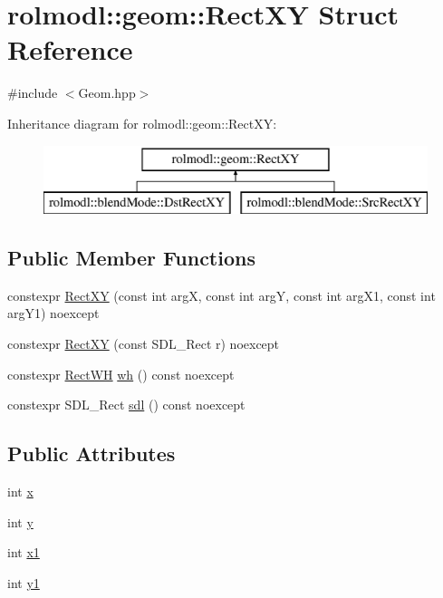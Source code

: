 \hypertarget{structrolmodl_1_1geom_1_1_rect_x_y}{}\section{rolmodl\+::geom\+::Rect\+XY Struct Reference}
\label{structrolmodl_1_1geom_1_1_rect_x_y}


{\ttfamily \#include $<$Geom.\+hpp$>$}

Inheritance diagram for rolmodl\+::geom\+::Rect\+XY\+:\begin{figure}[H]
\begin{center}
\leavevmode
\includegraphics[height=2.000000cm]{structrolmodl_1_1geom_1_1_rect_x_y}
\end{center}
\end{figure}
\subsection*{Public Member Functions}
\begin{DoxyCompactItemize}
\item 
constexpr \mbox{\hyperlink{structrolmodl_1_1geom_1_1_rect_x_y_a9ff683b479b94f3636c5b806db04295f}{Rect\+XY}} (const int argX, const int argY, const int arg\+X1, const int arg\+Y1) noexcept
\item 
constexpr \mbox{\hyperlink{structrolmodl_1_1geom_1_1_rect_x_y_aec79d83eaccbb02806a65cc811f0a05f}{Rect\+XY}} (const S\+D\+L\+\_\+\+Rect r) noexcept
\item 
constexpr \mbox{\hyperlink{structrolmodl_1_1geom_1_1_rect_w_h}{Rect\+WH}} \mbox{\hyperlink{structrolmodl_1_1geom_1_1_rect_x_y_ad47180f559f3389a30cda5a05bf686b2}{wh}} () const noexcept
\item 
constexpr S\+D\+L\+\_\+\+Rect \mbox{\hyperlink{structrolmodl_1_1geom_1_1_rect_x_y_aa535506f0b726013a819099528bfdf86}{sdl}} () const noexcept
\end{DoxyCompactItemize}
\subsection*{Public Attributes}
\begin{DoxyCompactItemize}
\item 
int \mbox{\hyperlink{structrolmodl_1_1geom_1_1_rect_x_y_ac66d8c9039bc0dedd2a34be448f96ca9}{x}}
\item 
int \mbox{\hyperlink{structrolmodl_1_1geom_1_1_rect_x_y_ae00de498b3b6e06dc0e2379e4f73a1ed}{y}}
\item 
int \mbox{\hyperlink{structrolmodl_1_1geom_1_1_rect_x_y_ae206fd9ea9f89161b512aacb3752db20}{x1}}
\item 
int \mbox{\hyperlink{structrolmodl_1_1geom_1_1_rect_x_y_a346e6cbedf70be8f442dbf35b635ad85}{y1}}
\end{DoxyCompactItemize}



